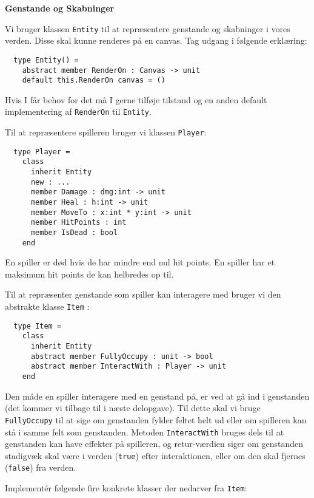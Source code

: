 \textbf{Genstande og Skabninger}

Vi bruger klassen \lstinline{Entity} til at repræsentere genstande og skabninger
i vores verden. Disse skal kunne renderes på en canvas. Tag udgang i
følgende erklæring:

\begin{lstlisting}
  type Entity() =
    abstract member RenderOn : Canvas -> unit
    default this.RenderOn canvas = ()
\end{lstlisting}

Hvis I får behov for det må I gerne tilføje tilstand og en anden
default implementering af \lstinline{RenderOn} til \lstinline{Entity}.

Til at repræsentere spilleren bruger vi klassen \lstinline{Player}:

\begin{lstlisting}
  type Player =
    class
      inherit Entity
      new : ...
      member Damage : dmg:int -> unit
      member Heal : h:int -> unit
      member MoveTo : x:int * y:int -> unit
      member HitPoints : int
      member IsDead : bool
    end
\end{lstlisting}

En spiller er død hvis de har mindre end nul hit points. En spiller
har et maksimum hit points de kan helbredes op til.

Til at repræsenter genstande som spiller kan interagere
med bruger vi den abstrakte klasse \lstinline{Item} :

\begin{lstlisting}
  type Item =
    class
      inherit Entity
      abstract member FullyOccupy : unit -> bool
      abstract member InteractWith : Player -> unit
    end
\end{lstlisting}

Den måde en spiller interagere med en genstand på, er ved at gå ind i genstanden (det
kommer vi tilbage til i næste delopgave). Til dette skal vi bruge
\lstinline{FullyOccupy} til at sige om genstanden fylder feltet helt ud eller om spilleren
kan stå i samme felt som genstanden. Metoden \lstinline{InteractWith} bruges
dels til at genstanden kan have effekter på spilleren, og
retur-værdien siger om genstanden stadigvæk skal være i verden
(\lstinline{true}) efter interaktionen, eller om den skal fjernes (\lstinline{false}) fra verden.

Implementér følgende fire konkrete klasser der nedarver fra \lstinline{Item}:


